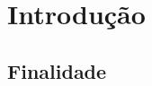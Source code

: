 \maketitle
\tableofcontents
\begin{versionhistory}
\end{versionhistory}

\chapter{Introdução}


\section{Finalidade}

